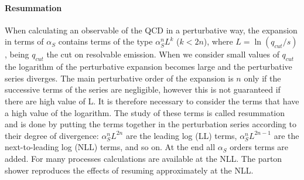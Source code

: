 \paragraph{Resummation} When calculating an observable of the QCD in a perturbative way, the expansion in terms of $ \alpha_S $ contains terms of the type $ \alpha_S^n L^k $ ($ k < 2n $), where $ L = \ln (q_{cut} / s) $, being $ q_{cut} $ the cut on resolvable emission. 
When we consider small values of  $q_{cut}$ the logarithm of the perturbative expansion becomes large and the  perturbative series diverges.
The main  perturbative order of the expansion is $n$  only if the successive terms of the series are negligible, however this is not guaranteed if there are high value of L. 
It is therefore necessary to consider the terms that have a high value of the logarithm. The study of these terms is called resummation and is done by putting the terms together in the perturbation series according to their degree of divergence:
$ \alpha_S ^ n L ^ {2n} $ are the leading log (LL) terms, $ \alpha_S ^ n L ^ {2n-1} $ are the next-to-leading log (NLL) terms, and so on. 
At the end  all $ \alpha_S $ orders terms are added. For many processes calculations are available at the NLL.
The parton shower reproduces the effects of resuming approximately at the NLL.

